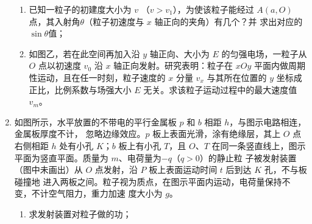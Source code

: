 \begin{enumerate}
\begin{enumerate}
\item 
已知一粒子的初建度大小为 $ v $
（$ v> v_{1} $），为使该粒子能经过 $ A(a , O) $点，其入射角$ \theta $（粒子初速度与 $ x $ 轴正向的夹角）有几个？并
求出对应的 $ \sin \theta $值；

\item 
如图乙，若在此空间再加入沿 $ y $ 轴正向、大小为 $ E $ 的匀强电场，一粒子从 $ O $ 点以初速度 $ v_{0} $ 沿
$ x $ 轴正向发射。研究表明：粒子在 $ xOy $ 平面内做周期性运动，且在任一时刻，粒子速度的 $ x $ 分量 $ v_{x} $
与其所在位置的 $ y $ 坐标成正比，比例系数与场强大小 $ E $ 无关。求该粒子运动过程中的最大速度值
$ v_{m} $。

\end{enumerate}
\begin{figure}[h!]
	\centering
\begin{subfigure}{0.4\linewidth}
	\centering
	 
	\caption{}\label{}
\end{subfigure}
\begin{subfigure}{0.4\linewidth}
	\centering
	 
	\caption{}\label{}
\end{subfigure}
\end{figure}




\item 
{}
如图所示，水平放置的不带电的平行金属板 $ p $ 和 $ b $ 相距 $ h $，与图示电路相连，金属板厚度不计，
忽略边缘效应。$ p $ 板上表面光滑，涂有绝缘层，其上 $ O $ 点右侧相距 $ h $ 处有小孔 $ K $；$ b $ 板上有小孔
$ T $，且 $ O $、$ T $ 在同一条竖直线上，图示平面为竖直平面。质量为 $ m $、电荷量为$ -q $（$ q>0 $）的静止粒
子被发射装置（图中未画出）从 $ O $ 点发射，沿 $ P $ 板上表面运动时间 $ t $ 后到达 $ K $ 孔，不与板碰撞地
进入两板之间。粒子视为质点，在图示平面内运动，电荷量保持不变，不计空气阻力，重力加速
度大小为 $ g $。
\begin{enumerate}
	\item
求发射装置对粒子做的功；


\end{enumerate}
\end{enumerate}
